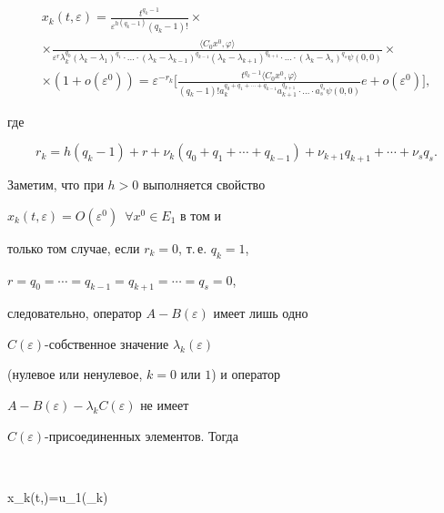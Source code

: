 \begin{multline*}


x_k(t,\varepsilon)=\frac{t^{q_k-1}}{\varepsilon^{h(q_k-1)}(q_k-1)!}\times\\


%


\times\frac{\langle C_0x^0,\varphi\rangle}


{\varepsilon^r\lambda_k^{q_0}(\lambda_k-\lambda_1)^{q_1} 


\cdot \dotsc \cdot 


(\lambda_k-\lambda_{k-1})^{q_{k-1}}(\lambda_k-\lambda_{k+1})


^{q_{k+1}}\cdot \dotsc \cdot (\lambda_k-\lambda_s)^{q_s}\psi(0,0)}\times\\


%


\times(1+o(\varepsilon^0))=\varepsilon^{-r_k}\bigg[


\frac{t^{q_k-1}\langle C_0x^0,\varphi\rangle}{(q_k-1)!a_k^{q_0+q_1+


\dotsb +q_{k-1}}a_{k+1}^{q_{k+1}}\cdot \dotsc \cdot


a_s^{q_s}\psi(0,0)}e+o(\varepsilon^0)\bigg],


\end{multline*}


где


$$


r_k=h(q_k-1)+r+\nu_k(q_0+q_1+ \dotsb


+q_{k-1})+\nu_{k+1}q_{k+1}+ \dotsb +\nu_sq_s.


$$


Заметим, что при $h>0$ выполняется свойство


$x_k(t,\varepsilon)=O(\varepsilon^0)$\, $\forall x^0\in E_1$ в том и


только том случае, если $r_k=0$, т.\,е. $q_k=1$,


$r=q_0=\dotsb =q_{k-1}=q_{k+1}= \dotsb =q_s=0$,


следовательно, оператор $A-B(\varepsilon)$ имеет лишь одно


$C(\varepsilon)$-собственное значение $\lambda_k(\varepsilon)$


(нулевое или ненулевое, $k=0$ или $1$) и оператор


$A-B(\varepsilon)-\lambda_k C(\varepsilon)$ не имеет


$C(\varepsilon)$-присоединенных элементов. Тогда


$$


x_k(t,\varepsilon)=u_1(\lambda_k)


